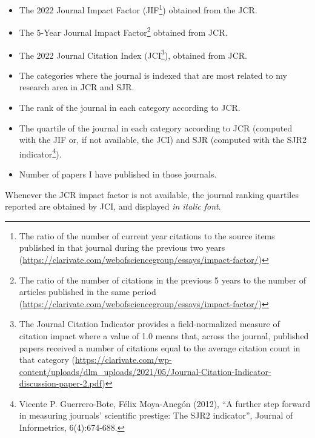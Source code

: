 \documentclass[
]{article}
\begin{document}
\begin{itemize}
\item
  The 2022 Journal Impact Factor (JIF\footnote{The ratio of the number
    of current year citations to the source items published in that
    journal during the previous two years
    (\url{https://clarivate.com/webofsciencegroup/essays/impact-factor/})})
  obtained from the JCR.
\item
  The 5-Year Journal Impact Factor\footnote{The ratio of the number of
    citations in the previous 5 years to the number of articles
    published in the same period
    (\url{https://clarivate.com/webofsciencegroup/essays/impact-factor/})}
  obtained from JCR.
\item
  The 2022 Journal Citation Index (JCI\footnote{The Journal Citation
    Indicator provides a field-normalized measure of citation impact
    where a value of 1.0 means that, across the journal, published
    papers received a number of citations equal to the average citation
    count in that category
    (\url{https://clarivate.com/wp-content/uploads/dlm_uploads/2021/05/Journal-Citation-Indicator-discussion-paper-2.pdf})}),
  obtained from JCR.
\item
  The categories where the journal is indexed that are most related to
  my research area in JCR and SJR.
\item
  The rank of the journal in each category according to JCR.
\item
  The quartile of the journal in each category according to JCR
  (computed with the JIF or, if not available, the JCI) and SJR
  (computed with the SJR2 indicator\footnote{Vicente P. Guerrero-Bote,
    Félix Moya-Anegón (2012), ``A further step forward in measuring
    journals' scientific prestige: The SJR2 indicator'', Journal of
    Informetrics, 6(4):674-688.}).
\item
  Number of papers I have published in those journals.
\end{itemize}

Whenever the JCR impact factor is not available, the journal ranking
quartiles reported are obtained by JCI, and displayed \emph{in italic
font}.
\end{document}
